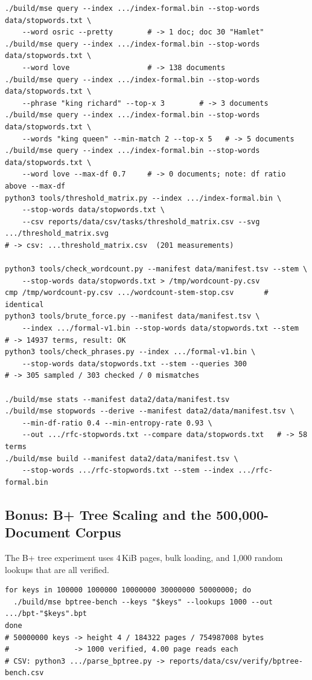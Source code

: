 \begin{lstlisting}[style=cli]
./build/mse query --index .../index-formal.bin --stop-words data/stopwords.txt \
    --word osric --pretty        # -> 1 doc; doc 30 "Hamlet"
./build/mse query --index .../index-formal.bin --stop-words data/stopwords.txt \
    --word love                  # -> 138 documents
./build/mse query --index .../index-formal.bin --stop-words data/stopwords.txt \
    --phrase "king richard" --top-x 3        # -> 3 documents
./build/mse query --index .../index-formal.bin --stop-words data/stopwords.txt \
    --words "king queen" --min-match 2 --top-x 5   # -> 5 documents
./build/mse query --index .../index-formal.bin --stop-words data/stopwords.txt \
    --word love --max-df 0.7     # -> 0 documents; note: df ratio above --max-df
python3 tools/threshold_matrix.py --index .../index-formal.bin \
    --stop-words data/stopwords.txt \
    --csv reports/data/csv/tasks/threshold_matrix.csv --svg .../threshold_matrix.svg
# -> csv: ...threshold_matrix.csv  (201 measurements)

python3 tools/check_wordcount.py --manifest data/manifest.tsv --stem \
    --stop-words data/stopwords.txt > /tmp/wordcount-py.csv
cmp /tmp/wordcount-py.csv .../wordcount-stem-stop.csv       # identical
python3 tools/brute_force.py --manifest data/manifest.tsv \
    --index .../formal-v1.bin --stop-words data/stopwords.txt --stem
# -> 14937 terms, result: OK
python3 tools/check_phrases.py --index .../formal-v1.bin \
    --stop-words data/stopwords.txt --stem --queries 300
# -> 305 sampled / 303 checked / 0 mismatches

./build/mse stats --manifest data2/data/manifest.tsv
./build/mse stopwords --derive --manifest data2/data/manifest.tsv \
    --min-df-ratio 0.4 --min-entropy-rate 0.93 \
    --out .../rfc-stopwords.txt --compare data/stopwords.txt   # -> 58 terms
./build/mse build --manifest data2/data/manifest.tsv \
    --stop-words .../rfc-stopwords.txt --stem --index .../rfc-formal.bin
\end{lstlisting}

\subsection{Bonus: B+ Tree Scaling and the 500,000-Document Corpus}

The B+ tree experiment uses 4\,KiB pages, bulk loading, and 1,000 random
lookups that are all verified.

\begin{lstlisting}[style=cli]
for keys in 100000 1000000 10000000 30000000 50000000; do
  ./build/mse bptree-bench --keys "$keys" --lookups 1000 --out .../bpt-"$keys".bpt
done
# 50000000 keys -> height 4 / 184322 pages / 754987008 bytes
#               -> 1000 verified, 4.00 page reads each
# CSV: python3 .../parse_bptree.py -> reports/data/csv/verify/bptree-bench.csv
\end{lstlisting}

